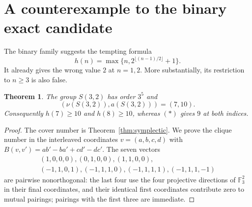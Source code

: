 \documentclass[11pt]{article}
\newtheorem{theorem}{Theorem}[section]
\theoremstyle{remark}
\newcommand{\nuG}{\nu}
\newcommand{\aG}{a}
\newcommand{\F}{\mathbb F}
\begin{document}
\section{A counterexample to the binary exact candidate}

The binary family suggests the tempting formula
\[
 h(n)=\max\{n,2^{\lfloor(n-1)/2\rfloor}+1\}.\tag{$*$}
\]
It already gives the wrong value $2$ at $n=1,2$.  More substantially, its
restriction to $n\ge3$ is also false.

\begin{theorem}\label{thm:counterexample}
The group $S(3,2)$ has order $3^5$ and
\[
 (\nuG(S(3,2)),\aG(S(3,2)))=(7,10).
\]
Consequently $h(7)\ge10$ and $h(8)\ge10$, whereas $(*)$ gives $9$ at both
indices.
\end{theorem}

\begin{proof}
The cover number is Theorem~\ref{thm:symplectic}.  We prove the clique
number in the interleaved coordinates $v=(a,b,c,d)$ with
$B(v,v')=ab'-ba'+cd'-dc'$.  The seven vectors
\[
\begin{gathered}
(1,0,0,0),(0,1,0,0),(1,1,0,0),\\
(-1,1,0,1),(-1,1,1,0),(-1,1,1,1),(-1,1,1,-1)
\end{gathered}
\]
are pairwise nonorthogonal: the last four use the four projective directions
of $\F_3^2$ in their final coordinates, and their identical first
coordinates contribute zero to mutual pairings; pairings with the first
three are immediate.


\end{proof}
\end{document}
